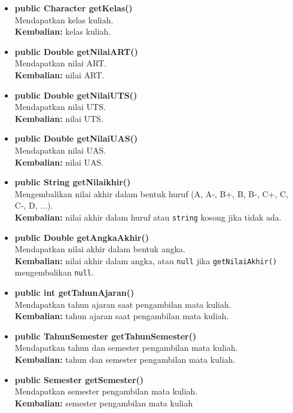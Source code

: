 \begin{enumerate}
\begin{itemize}
\begin{itemize}
					\item \textbf{public Character getKelas()}\\
						Mendapatkan kelas kuliah.\\
						\textbf{Kembalian:} kelas kuliah.
						
					\item \textbf{public Double getNilaiART()}\\
						Mendapatkan nilai ART.\\
						\textbf{Kembalian:} nilai ART.
						
					\item \textbf{public Double getNilaiUTS()}\\
						Mendapatkan nilai UTS.\\
						\textbf{Kembalian:} nilai UTS.
						
					\item \textbf{public Double getNilaiUAS()}\\
						Mendapatkan nilai UAS.\\
						\textbf{Kembalian:} nilai UAS.
						
					\item \textbf{public String getNilaikhir()}\\
						Mengembalikan nilai akhir dalam bentuk huruf (A, A-, B+, B, B-, C+, C, C-, D, ...).\\
						\textbf{Kembalian:} nilai akhir dalam huruf atau \texttt{string} kosong jika tidak ada.
					
					\item \textbf{public Double getAngkaAkhir()}\\
						Mendapatkan nilai akhir dalam bentuk angka.\\
						\textbf{Kembalian:} nilai akhir dalam angka, atau \texttt{null} jika \texttt{getNilaiAkhir()} mengembalikan \texttt{null}.
					
					\item \textbf{public int getTahunAjaran()}\\
						Mendapatkan tahun ajaran saat pengambilan mata kuliah.\\
						\textbf{Kembalian:} tahun ajaran saat pengambilan mata kuliah.
					
					\item \textbf{public TahunSemester getTahunSemester()}\\
						Mendapatkan tahun dan semester pengambilan mata kuliah.\\
						\textbf{Kembalian:} tahun dan semester pengambilan mata kuliah.	
						
					\item \textbf{public Semester getSemester()}\\
						Mendapatkan semester pengambilan mata kuliah.\\
						\textbf{Kembalian:} semester pengambilan mata kuliah
				\end{itemize}
		\end{itemize}
\end{enumerate}


